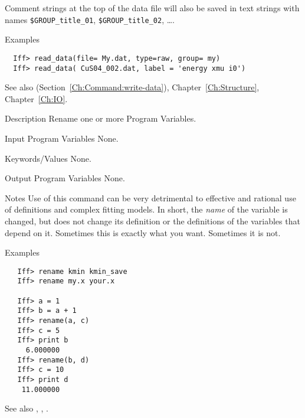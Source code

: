 \begin{IFFcom}
  Comment strings at the top of the data file will also be saved in text
  strings with names {\tt{\$GROUP\_title\_01}}, {\tt{\$GROUP\_title\_02}},
  \ldots. 

\item[Examples] {\hspace{1.in} \vspace{-0.1truein} \relax }
\begin{verbatim} 
  Iff> read_data(file= My.dat, type=raw, group= my)
  Iff> read_data( CuS04_002.dat, label = 'energy xmu i0')
\end{verbatim}
\item[See also]
{} (Section~\ref{Ch:Command:write-data}), 
Chapter~{\ref{Ch:Structure}}, Chapter~{\ref{Ch:IO}}.
\end{IFFcom}




\begin{IFFcom}
\item[Description] Rename one or more Program Variables.  
\item[Input Program Variables] None.
\item[Keywords/Values] None.
\item[Output Program Variables] None.
\item[Notes] Use of this command can be very detrimental to effective and
  rational use of definitions and complex fitting models. In short, the
  {\emph{name}} of the variable is changed, but does not change its definition
  or the definitions of the variables that depend on it.  Sometimes this is
  exactly what you want.  Sometimes it is not.
\item[Examples] {\hspace{1.in} \vspace{-0.1truein} \relax }
\begin{verbatim} 
   Iff> rename kmin kmin_save
   Iff> rename my.x your.x

   Iff> a = 1
   Iff> b = a + 1
   Iff> rename(a, c)
   Iff> c = 5
   Iff> print b
     6.000000
   Iff> rename(b, d)
   Iff> c = 10
   Iff> print d
    11.000000
\end{verbatim}
\noindent
\item[See also] {}, {}, {}.
\end{IFFcom}



